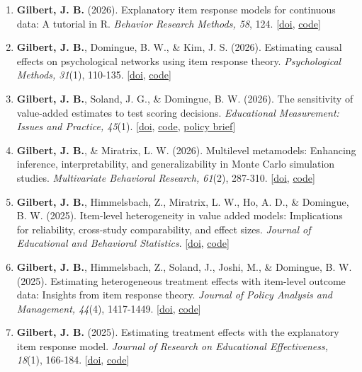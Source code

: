 \documentclass[11pt]{article}
\begin{document}
\begin{enumerate}
\item \textbf{Gilbert, J. B.} (2026). Explanatory item response models for continuous data: A tutorial in R. \textit{Behavior Research Methods, 58}, 124. [\href{https://doi.org/10.3758/s13428-026-02986-2}{doi}, \href{https://doi.org/10.7910/DVN/CIRSL1}{code}]
\item \textbf{Gilbert, J. B.}, Domingue, B. W., \& Kim, J. S. (2026). Estimating causal effects on psychological networks using item response theory. \textit{Psychological Methods, 31}(1), 110-135. [\href{https://doi.org/10.1037/met0000764}{doi}, \href{https://doi.org/10.7910/DVN/CVO9EZ}{code}] \label{pm_net_psy} 
\item \textbf{Gilbert, J. B.}, Soland, J. G., \& Domingue, B. W. (2026). The sensitivity of value-added estimates to test scoring decisions. \textit{Educational Measurement: Issues and Practice, 45}(1). [\href{http://dx.doi.org/10.1111/emip.70011}{doi}, \href{https://doi.org/10.7910/DVN/AJDUN2}{code}, \href{https://scholars.org/contribution/how-test-scoring-decisions-affect-school}{policy brief}]
\item \textbf{Gilbert, J. B.}, \& Miratrix, L. W. (2026). Multilevel metamodels: Enhancing inference, interpretability, and generalizability in Monte Carlo simulation studies. \textit{Multivariate Behavioral Research, 61}(2), 287-310. [\href{https://doi.org/10.1080/00273171.2025.2586631}{doi}, \href{https://researchbox.org/2429}{code}] \label{mlmm}
\item \textbf{Gilbert, J. B.}, Himmelsbach, Z., Miratrix, L. W., Ho, A. D., \& Domingue, B. W. (2025). Item-level heterogeneity in value added models: Implications for reliability, cross-study comparability, and effect sizes. \textit{Journal of Educational and Behavioral Statistics}. [\href{https://journals.sagepub.com/doi/10.3102/10769986251393339}{doi}, \href{https://doi.org/10.7910/DVN/89YITQ}{code}] \label{item_vam} 
\item  \textbf{Gilbert, J. B.}, Himmelsbach, Z., Soland, J., Joshi, M., \& Domingue, B. W. (2025). Estimating heterogeneous treatment effects with item-level outcome data: Insights from item response theory. \textit{Journal of Policy Analysis and Management, 44}(4), 1417-1449. [\href{https://doi.org/10.1002/pam.70025}{doi}, \href{https://doi.org/10.7910/DVN/C4TJCA}{code}] \label{ilhte-econ}
\item \textbf{Gilbert, J. B.} (2025). Estimating treatment effects with the explanatory item response model. \textit{Journal of Research on Educational Effectiveness, 18}(1), 166-184. [\href{https://www.tandfonline.com/doi/pdf/10.1080/19345747.2023.2287601?casa_token=jiL645zCNgcAAAAA:vA7BqwhzE_Nd8ccnzawcInnJ8hnO1wYaNllU1PryObJBEv0iPavpbBBhdXgb81JFq6tnCf6uPzNx}{doi}, \href{https://researchbox.org/797}{code}]

\end{enumerate}
\end{document}
